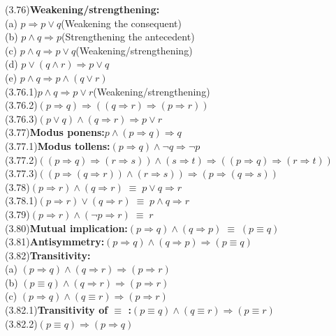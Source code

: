 \documentclass[12pt, fleqn, leqno]{article}
\newcommand{\lgap}{2pt}                             %
\newcommand{\equivs}{\ensuremath{\;\equiv\;}}       %
\newcommand{\impl}{\ensuremath{\Rightarrow}}        %
\begin{document}
\begin{tabbing}
(3.76)\>\textbf{Weakening/strengthening:}\\
      \> (a)\> $p\impl p\lor q$\quad \quad \quad (Weakening the consequent)\\[\lgap]
      \> (b)\> $p\land q \impl p$\quad \quad \quad (Strengthening the antecedent)\\[\lgap]
      \> (c)\> $p\land q \impl p\lor q$\quad \quad \quad (Weakening/strengthening)\\[\lgap]
      \> (d)\> $p\lor (q\land r) \impl p\lor q$\\[\lgap]
      \> (e)\> $p\land q \impl p\land (q \lor r)$\\[\lgap]
(3.76.1)\>$p\land q \impl p\lor r$\quad \quad \quad (Weakening/strengthening)\\[\lgap]
(3.76.2)\>$(p\impl q) \impl ((q\impl r)\impl (p\impl r))$\\[\lgap]
(3.76.3)\>$(p\lor q) \land (q \impl r)\impl p\lor r$\\[\lgap]
(3.77)\>\textbf{Modus ponens:}\quad $p\land (p\impl q)\impl q$\\[\lgap]
(3.77.1)\>\textbf{Modus tollens:}\quad $(p\impl q)\land \neg q \impl \neg p$\\[\lgap]
(3.77.2)\>$((p \impl q) \impl (r \impl s)) \land (s \impl t) \impl ((p \impl q) \impl (r \impl t))$\\[\lgap]
(3.77.3)\>$((p \impl (q \impl r )) \land (r \impl s)) \impl (p \impl (q \impl s))$\\[\lgap]
(3.78)\>$(p\impl r) \land (q\impl r) \equivs p\lor q\impl r$\\[\lgap]
(3.78.1)\>$(p\impl r)\lor (q\impl r) \equivs p\land q\impl r$\\[\lgap]
(3.79)\>$(p\impl r) \land (\neg p\impl r) \equivs r$\\[\lgap]
(3.80)\>\textbf{Mutual implication:}\quad $(p\impl q) \land (q\impl p) \equivs (p\equiv q)$\\[\lgap]
(3.81)\>\textbf{Antisymmetry:}\quad $(p\impl q) \land (q\impl p) \impl (p\equiv q)$\\[\lgap]
(3.82)\>\textbf{Transitivity:}\\
      \> (a)\> $(p\impl q) \land (q\impl r) \impl (p\impl r)$\\[\lgap]
      \> (b)\> $(p\equiv q) \land (q\impl r) \impl (p\impl r)$\\[\lgap]
      \> (c)\> $(p\impl q) \land (q\equiv r) \impl (p\impl r)$\\[\lgap]
(3.82.1)\>\textbf{Transitivity of $\equiv$ :}\quad $(p\equiv q)\land (q\equiv r)\impl (p\equiv r)$\\[\lgap]
(3.82.2)\>$(p\equiv q)\impl (p\impl q)$\\
\end{tabbing}
\end{document}

